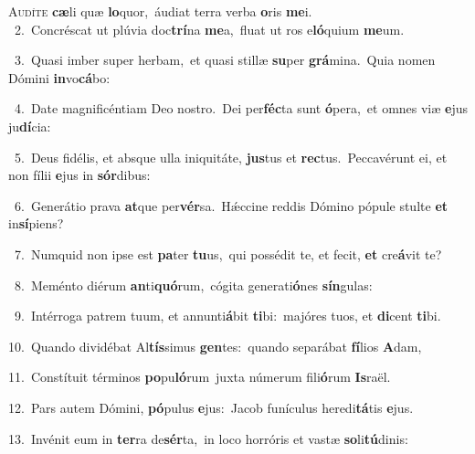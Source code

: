 \lettrine{\initial\textcolor{\initialcolor}{A}}{udíte} \textbf{cæ}\-li quæ \textbf{lo}\-quor,~\star áudiat terra verba \textbf{o}\-ris \textbf{me}\-i.\\
{\numbfont\textcolor{\numbcolor}{~2.}}~Concréscat ut plúvia doc\-\textbf{trí}\-na \textbf{me}\-a,~\star fluat ut ros e\-\textbf{ló}\-quium \textbf{me}\-um.\par
{\numbfont\textcolor{\numbcolor}{~3.}}~Quasi imber super herbam,~\dagger et quasi stillæ \textbf{su}\-per \textbf{grá}\-mina.~\star Quia nomen Dómini \textbf{in}\-vo\-\textbf{cá}\-bo:\par
{\numbfont\textcolor{\numbcolor}{~4.}}~Date magnificéntiam Deo nostro.~\dagger Dei per\-\textbf{féc}\-ta sunt \textbf{ó}\-pera,~\star et omnes viæ \textbf{e}\-jus ju\-\textbf{dí}\-cia:\par
{\numbfont\textcolor{\numbcolor}{~5.}}~Deus fidélis, et absque ulla iniquitáte, \textbf{jus}\-tus et \textbf{rec}\-tus.~\star Peccavérunt ei, et non fílii \textbf{e}\-jus in \textbf{sór}\-dibus:\par
{\numbfont\textcolor{\numbcolor}{~6.}}~Generátio prava \textbf{at}\-que per\-\textbf{vér}\-sa.~\star Hǽccine reddis Dómino pópule stulte \textbf{et} in\-\textbf{sí}\-piens?\par
{\numbfont\textcolor{\numbcolor}{~7.}}~Numquid non ipse est \textbf{pa}\-ter \textbf{tu}\-us,~\star qui possédit te, et fecit, \textbf{et} cre\-\textbf{á}\-vit te?\par
{\numbfont\textcolor{\numbcolor}{~8.}}~Meménto diérum \textbf{an}\-ti\-\textbf{quó}\-rum,~\star cógita generati\-\textbf{ó}\-nes \textbf{sín}\-gulas:\par
{\numbfont\textcolor{\numbcolor}{~9.}}~Intérroga patrem tuum, et annunti\-\textbf{á}\-bit \textbf{ti}\-bi:~\star majóres tuos, et \textbf{di}\-cent \textbf{ti}\-bi.\par
{\numbfont\textcolor{\numbcolor}{10.}}~Quando dividébat Al\-\textbf{tís}\-simus \textbf{gen}\-tes:~\star quando separábat \textbf{fí}\-lios \textbf{A}\-dam,\par
{\numbfont\textcolor{\numbcolor}{11.}}~Constítuit términos \textbf{po}\-pu\-\textbf{ló}\-rum~\star juxta númerum fili\-\textbf{ó}\-rum \textbf{Is}\-raël.\par
{\numbfont\textcolor{\numbcolor}{12.}}~Pars autem Dómini, \textbf{pó}\-pulus \textbf{e}\-jus:~\star Jacob funículus heredi\-\textbf{tá}\-tis \textbf{e}\-jus.\par
{\numbfont\textcolor{\numbcolor}{13.}}~Invénit eum in \textbf{ter}\-ra de\-\textbf{sér}\-ta,~\star in loco horróris et vastæ \textbf{so}\-li\-\textbf{tú}\-dinis:\par
